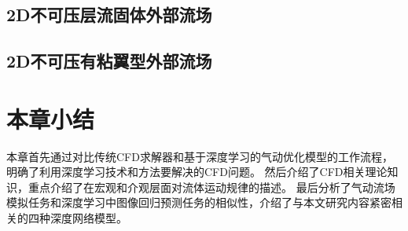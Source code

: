 \subsection{2D不可压层流固体外部流场}
\subsection{2D不可压有粘翼型外部流场}



\section{本章小结}

本章首先通过对比传统CFD求解器和基于深度学习的气动优化模型的工作流程，明确了利用深度学习技术和方法要解决的CFD问题。
然后介绍了CFD相关理论知识，重点介绍了在宏观和介观层面对流体运动规律的描述。
最后分析了气动流场模拟任务和深度学习中图像回归预测任务的相似性，介绍了与本文研究内容紧密相关的四种深度网络模型。





